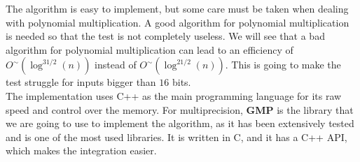 The algorithm is easy to implement, but some care must be taken when dealing with polynomial multiplication. A good algorithm for polynomial multiplication is needed so that the test is not completely useless. We will see that a bad algorithm for polynomial multiplication can lead to an efficiency of $O^\sim(\log^{31/2}(n))$ instead of $O^\sim(\log^{21/2}(n))$. This is going to make the test struggle for inputs bigger than $16$ bits.\\

The implementation uses C++ as the main programming language for its raw speed and control over the memory. For multiprecision, \textbf{GMP} is the library that we are going to use to implement the algorithm, as it has been extensively tested and is one of the most used libraries. It is written in C, and it has a C++ API, which makes the integration easier.

\endinput
